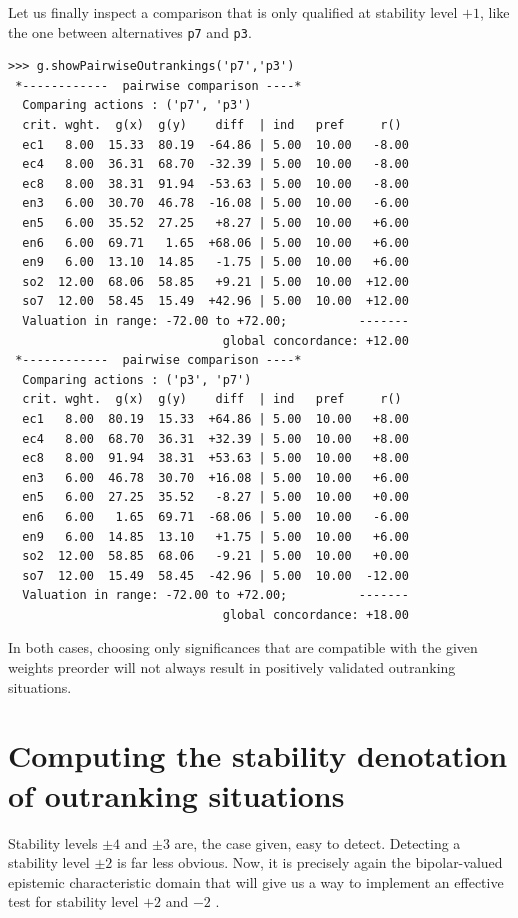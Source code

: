 Let us finally inspect a comparison that is only qualified at stability level $+1$, like the one between alternatives \texttt{p7} and \texttt{p3}.
\begin{lstlisting}[caption={Comparison of alternatives \texttt{p7} and \texttt{p3}},label=list:19.6]
>>> g.showPairwiseOutrankings('p7','p3')
 *------------  pairwise comparison ----*
  Comparing actions : ('p7', 'p3')
  crit. wght.  g(x)  g(y)    diff  | ind   pref     r()
  ec1   8.00  15.33  80.19  -64.86 | 5.00  10.00   -8.00
  ec4   8.00  36.31  68.70  -32.39 | 5.00  10.00   -8.00
  ec8   8.00  38.31  91.94  -53.63 | 5.00  10.00   -8.00
  en3   6.00  30.70  46.78  -16.08 | 5.00  10.00   -6.00
  en5   6.00  35.52  27.25   +8.27 | 5.00  10.00   +6.00
  en6   6.00  69.71   1.65  +68.06 | 5.00  10.00   +6.00
  en9   6.00  13.10  14.85   -1.75 | 5.00  10.00   +6.00
  so2  12.00  68.06  58.85   +9.21 | 5.00  10.00  +12.00
  so7  12.00  58.45  15.49  +42.96 | 5.00  10.00  +12.00
  Valuation in range: -72.00 to +72.00;          -------
                              global concordance: +12.00
 *------------  pairwise comparison ----*
  Comparing actions : ('p3', 'p7')
  crit. wght.  g(x)  g(y)    diff  | ind   pref     r()
  ec1   8.00  80.19  15.33  +64.86 | 5.00  10.00   +8.00
  ec4   8.00  68.70  36.31  +32.39 | 5.00  10.00   +8.00
  ec8   8.00  91.94  38.31  +53.63 | 5.00  10.00   +8.00
  en3   6.00  46.78  30.70  +16.08 | 5.00  10.00   +6.00
  en5   6.00  27.25  35.52   -8.27 | 5.00  10.00   +0.00
  en6   6.00   1.65  69.71  -68.06 | 5.00  10.00   -6.00
  en9   6.00  14.85  13.10   +1.75 | 5.00  10.00   +6.00
  so2  12.00  58.85  68.06   -9.21 | 5.00  10.00   +0.00
  so7  12.00  15.49  58.45  -42.96 | 5.00  10.00  -12.00
  Valuation in range: -72.00 to +72.00;          -------
                              global concordance: +18.00
\end{lstlisting}

In both cases, choosing only significances that are compatible with the given weights preorder will not always result in positively validated outranking situations.

\section{Computing the stability denotation of outranking situations}
\label{sec:19.3}

Stability levels $\pm 4$ and $\pm 3$ are, the case given, easy to detect. Detecting a stability level $\pm 2$ is far less obvious.  Now, it is precisely again the bipolar-valued epistemic characteristic domain that will give us a way to implement an effective test for stability level $+2$ and $-2$ \citep{BIS-2004b,BIS-2004c}. 

